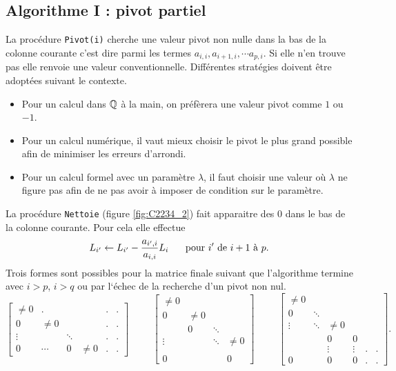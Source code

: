 \subsection{Algorithme I : pivot partiel}
La procédure \verb|Pivot(i)| cherche une valeur pivot non nulle dans la bas de la colonne courante c'est dire parmi les termes $a_{i,i},a_{i+1,i},\cdots a_{p,i}$. Si elle n'en trouve pas elle renvoie une valeur conventionnelle.\newline
Différentes stratégies doivent être adoptées suivant le contexte.
\begin{itemize}
  \item Pour un calcul dans $\mathbb{Q}$ \og à la main\fg, on préfèrera une valeur pivot comme $1$ ou $-1$.
  \item Pour un calcul numérique, il vaut mieux choisir le pivot le plus grand possible afin de minimiser les erreurs d'arrondi.
  \item Pour un calcul formel avec un paramètre $\lambda$, il faut choisir une valeur où $\lambda$ ne figure pas afin de ne pas avoir à imposer de condition sur le paramètre. 
\end{itemize}

La procédure \verb|Nettoie| (figure \ref{fig:C2234_2}) fait apparaitre des $0$ dans le bas de la colonne courante. Pour cela elle effectue
\[
 L_{i'}\leftarrow L_{i'}-\frac{a_{i',i}}{a_{i,i}}L_i \hspace{0.5cm} \text{ pour } i' \text{ de } i+1 \text{ à } p.
\]
Trois formes sont possibles pour la matrice finale suivant que l'algorithme termine avec $i>p$, $i>q$ ou par l`échec de la recherche d'un pivot non nul. 
\[
 \begin{bmatrix}
\neq 0 &   .     &        &        & . & . \\
0      & \neq 0  &        &        & . & . \\
\vdots &         & \ddots &        & . & . \\
0      &\cdots  &     0   &\neq 0  & . & .
 \end{bmatrix}
\hspace{1cm} 
 \begin{bmatrix}
\neq 0&       &       &  \\
 0    &\neq 0 &       &  \\
      & 0     &\ddots &  \\
\vdots&       &\ddots & \neq 0 \\
      &       &       &  \\
 0    &       &       & 0
 \end{bmatrix}
\hspace{1cm}
\begin{bmatrix}
 \neq 0 &  &  &  &  &  \\
 0 & \ddots &  &  &  &  \\
 \vdots &\ddots  &\neq 0  &  &  &  \\
        &        &0  &0  &  &  \\
        &        &\vdots & \vdots & . & . \\
 0      &        &   0   &   0    & . &. 
\end{bmatrix}.
\]

